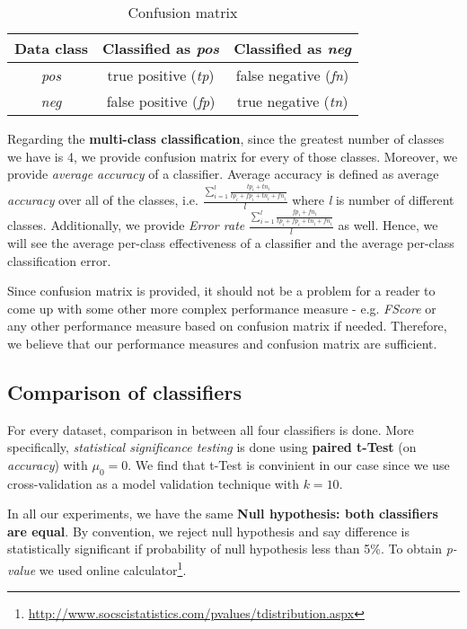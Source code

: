 \documentclass[11pt,a4paper,titlepage]{article}
\begin{document}
  \begin{table}
  \centering
  \begin{tabular}{| c | c | c |}
    \hline
    Data class & Classified as \textit{pos} & Classified as \textit{neg} \\ \hline
    \textit{pos} & true positive (\textit{tp}) & false negative (\textit{fn}) \\ \hline
    \textit{neg} & false positive (\textit{fp}) & true negative (\textit{tn}) \\
    \hline
  \end{tabular}
  \caption{Confusion matrix}
  \label{table:confusionMatrix}
  \end{table}

Regarding the \textbf{multi-class classification}, since the greatest number of classes we have is 4, we  provide confusion matrix for every of those classes. Moreover, we provide \textit{average accuracy} of a classifier. Average accuracy is defined as average \textit{accuracy} over all of the classes, i.e. $\frac{\sum_{i=1}^{l}\frac{tp_i + tn_i}{tp_i + fp_i + tn_i + fn_i}}{l}$ where \textit{l} is number of different classes. Additionally, we provide \textit{Error rate} $\frac{\sum_{i=1}^{l}\frac{fp_i + fn_i}{tp_i + fp_i + tn_i + fn_i}}{l}$ as well. Hence, we will see the average per-class effectiveness of a classifier and the average per-class classification error.

Since confusion matrix is provided, it should not be a problem for a reader to come up with some other more complex performance measure - e.g. \textit{FScore} or any other performance measure based on confusion matrix if needed. Therefore, we believe that our performance measures and confusion matrix are sufficient.

\subsection{Comparison of classifiers}

For every dataset, comparison in between all four classifiers is done. More specifically, \textit{statistical significance testing} is done using \textbf{paired t-Test} (on \textit{accuracy}) with $\mu_0 = 0$. We find that t-Test is convinient in our case since we use cross-validation as a model validation technique with $k=10$. 

In all our experiments, we have the same \textbf{Null hypothesis: both classifiers are equal}. By convention, we reject null hypothesis and say difference is statistically significant if probability of null hypothesis less than 5\%. To obtain \textit{p-value} we used online calculator\footnote{\url{http://www.socscistatistics.com/pvalues/tdistribution.aspx}}.
\end{document}

